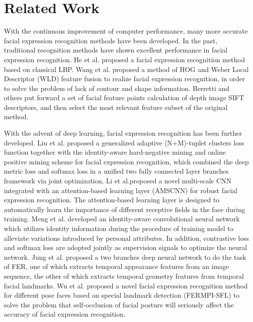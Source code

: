 \documentclass[10pt, conference, compsocconf]{IEEEtran}
\begin{document}
\section{Related Work}

With the continuous improvement of computer performance, many more accurate facial expression recognition methods have been developed. In the past, traditional recognition methods have shown excellent performance in facial expression recognition. He\cite{He2005An} et al. proposed a facial expression recognition method based on classical LBP. Wang\cite{Wang2014Feature} et al. proposed a method of HOG and Weber Local Descriptor (WLD) feature fusion to realize facial expression recognition, in order to solve the problem of lack of contour and shape information. Berretti\cite{Berretti2010A} and others put forward a set of facial feature points calculation of depth image SIFT descriptors, and then select the most relevant feature subset of the original method.

With the advent of deep learning, facial expression recognition has been further developed. Liu\cite{Liu2017Adaptive} et al. proposed a generalized adaptive (N+M)-tuplet clusters loss function together with the identity-aware hard-negative mining and online positive mining scheme for facial expression recognition, which combined the deep metric loss and softmax loss in a unified two fully connected layer branches framework via joint optimization. Li\cite{li2018facial} et al.proposed a novel multi-scale CNN integrated with an attention-based learning layer (AMSCNN) for robust facial expression recognition. The attention-based learning layer is designed to automatically learn the importance of different receptive fields in the face during training. Meng\cite{Meng2017Identity} et al. developed an identity-aware convolutional neural network which utilizes identity information during the procedure of training model to alleviate variations introduced by personal attributes. In addition, contrastive loss and softmax loss are adopted jointly as supervision signals to optimize the neural network. Jung\cite{Jung2015Joint} et al. proposed a two branches deep neural network to do the task of FER, one of which extracts temporal appearance features from an image sequence, the other of which extracts temporal geometry features from temporal facial landmarks. Wu\cite{wu2018facial} et al. proposed a novel facial expression recognition method for different pose faces based on special landmark detection (FERMPI-SFL) to solve the problem that self-occlusion of facial posture will seriously affect the accuracy of facial expression recognition. 
\end{document}
